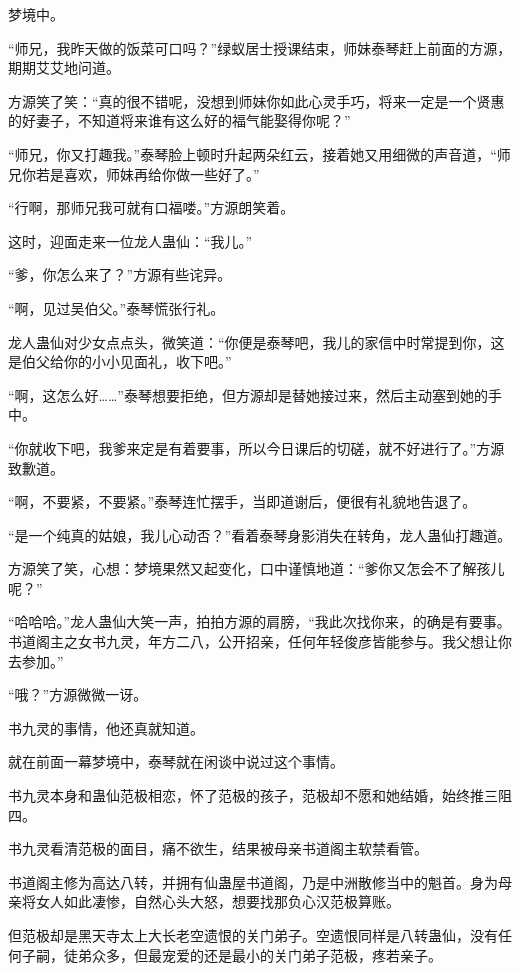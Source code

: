 
\begin{this_body}

梦境中。

“师兄，我昨天做的饭菜可口吗？”绿蚁居士授课结束，师妹泰琴赶上前面的方源，期期艾艾地问道。

方源笑了笑：“真的很不错呢，没想到师妹你如此心灵手巧，将来一定是一个贤惠的好妻子，不知道将来谁有这么好的福气能娶得你呢？”

“师兄，你又打趣我。”泰琴脸上顿时升起两朵红云，接着她又用细微的声音道，“师兄你若是喜欢，师妹再给你做一些好了。”

“行啊，那师兄我可就有口福喽。”方源朗笑着。

这时，迎面走来一位龙人蛊仙：“我儿。”

“爹，你怎么来了？”方源有些诧异。

“啊，见过吴伯父。”泰琴慌张行礼。

龙人蛊仙对少女点点头，微笑道：“你便是泰琴吧，我儿的家信中时常提到你，这是伯父给你的小小见面礼，收下吧。”

“啊，这怎么好……”泰琴想要拒绝，但方源却是替她接过来，然后主动塞到她的手中。

“你就收下吧，我爹来定是有着要事，所以今日课后的切磋，就不好进行了。”方源致歉道。

“啊，不要紧，不要紧。”泰琴连忙摆手，当即道谢后，便很有礼貌地告退了。

“是一个纯真的姑娘，我儿心动否？”看着泰琴身影消失在转角，龙人蛊仙打趣道。

方源笑了笑，心想：梦境果然又起变化，口中谨慎地道：“爹你又怎会不了解孩儿呢？”

“哈哈哈。”龙人蛊仙大笑一声，拍拍方源的肩膀，“我此次找你来，的确是有要事。书道阁主之女书九灵，年方二八，公开招亲，任何年轻俊彦皆能参与。我父想让你去参加。”

“哦？”方源微微一讶。

书九灵的事情，他还真就知道。

就在前面一幕梦境中，泰琴就在闲谈中说过这个事情。

书九灵本身和蛊仙范极相恋，怀了范极的孩子，范极却不愿和她结婚，始终推三阻四。

书九灵看清范极的面目，痛不欲生，结果被母亲书道阁主软禁看管。

书道阁主修为高达八转，并拥有仙蛊屋书道阁，乃是中洲散修当中的魁首。身为母亲将女人如此凄惨，自然心头大怒，想要找那负心汉范极算账。

但范极却是黑天寺太上大长老空遗恨的关门弟子。空遗恨同样是八转蛊仙，没有任何子嗣，徒弟众多，但最宠爱的还是最小的关门弟子范极，疼若亲子。


\end{this_body}
